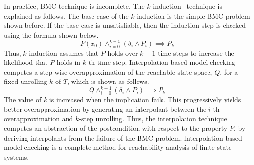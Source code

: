 %
In practice, BMC technique is incomplete. 
The $k$-induction~\cite{fmcad2000} technique 
is explained as follows. 
%
The base case of the $k$-induction is the
simple BMC problem shown before. If the 
base case is unsatisfiable, then the 
induction step is checked using the formula 
shown below.  
%
\[ P(x_0) \wedge_{i=0}^{k-1} (\delta_i \wedge P_i) \implies P_k \]
%
Thus, $k$-induction assumes that $P$ holds 
over $k-1$ time steps to increase the 
likelihood that $P$ holds in $k$-th time step.
%
%
Interpolation-based model checking~\cite{cav03} 
computes a step-wise overapproximation of the reachable state-space,
$Q$, for a fixed unrolling $k$ of $T$, which is shown as
follows.
%
\[ Q \wedge_{i=0}^{k-1} (\delta_i \wedge P_i) \implies P_k \]
%
The value of $k$ is increased when the implication fails. This
progressively yields better overapproximation by 
generating an interpolant between the $i$-th 
overapproximation and $k$-step unrolling.
Thus, the interpolation technique computes an abstraction 
of the postcondition with respect to the property $P$, 
by deriving interpolants from the failure of the
BMC problem.
%
Interpolation-based model checking is a complete method 
for reachability analysis of finite-state systems. 
%

